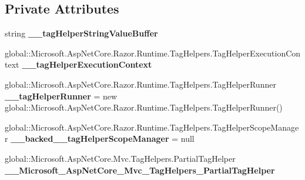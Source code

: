 \subsection*{Private Attributes}
\begin{DoxyCompactItemize}
\item 
\mbox{\label{class_asp_net_core_1_1_views___shared____header_a541005a0d43be249a71fdd4fe44664e3}} 
string {\bfseries \+\_\+\+\_\+tag\+Helper\+String\+Value\+Buffer}
\item 
\mbox{\label{class_asp_net_core_1_1_views___shared____header_af22ed56563f9833ba773c31a4be1ecd9}} 
global\+::\+Microsoft.\+Asp\+Net\+Core.\+Razor.\+Runtime.\+Tag\+Helpers.\+Tag\+Helper\+Execution\+Context {\bfseries \+\_\+\+\_\+tag\+Helper\+Execution\+Context}
\item 
\mbox{\label{class_asp_net_core_1_1_views___shared____header_a8e8c39385506bf7b1049295b086b2412}} 
global\+::\+Microsoft.\+Asp\+Net\+Core.\+Razor.\+Runtime.\+Tag\+Helpers.\+Tag\+Helper\+Runner {\bfseries \+\_\+\+\_\+tag\+Helper\+Runner} = new global\+::\+Microsoft.\+Asp\+Net\+Core.\+Razor.\+Runtime.\+Tag\+Helpers.\+Tag\+Helper\+Runner()
\item 
\mbox{\label{class_asp_net_core_1_1_views___shared____header_a8851c60022cb4c522182d559abf0f81b}} 
global\+::\+Microsoft.\+Asp\+Net\+Core.\+Razor.\+Runtime.\+Tag\+Helpers.\+Tag\+Helper\+Scope\+Manager {\bfseries \+\_\+\+\_\+backed\+\_\+\+\_\+tag\+Helper\+Scope\+Manager} = null
\item 
\mbox{\label{class_asp_net_core_1_1_views___shared____header_a9bf3e6b5eae3fa8dc5bcf7e9b5bf3017}} 
global\+::\+Microsoft.\+Asp\+Net\+Core.\+Mvc.\+Tag\+Helpers.\+Partial\+Tag\+Helper {\bfseries \+\_\+\+\_\+\+Microsoft\+\_\+\+Asp\+Net\+Core\+\_\+\+Mvc\+\_\+\+Tag\+Helpers\+\_\+\+Partial\+Tag\+Helper}
\end{DoxyCompactItemize}
